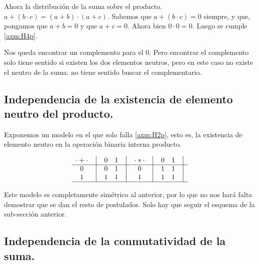 \documentclass[final,12pt,a4paper,twoside,fleqn]{extbook}
\theoremstyle{definition}
\theoremstyle{remark}
\begin{document}
	Ahora la distribución de la suma sobre el producto. \( a + ( b \cdot c )
= (a + b) \cdot (a + c) \). Sabemos que \(a + (b \cdot c) = 0\) siempre, y
que, pongamos que \( a + b = 0 \) y que \(a + c = 0 \). Ahora bien \(0 \cdot
0 = 0\). Luego se cumple \ref{axm:H4p}.


	Nos queda encontrar un complemento para el \(0\). Pero encontrar el
complemento solo tiene sentido si existen los dos elementos neutros, pero en
este caso no existe el neutro de la suma: no tiene sentido buscar el
complementario.



\subsection{Independencia de la existencia de elemento neutro del producto.}



	Exponemos un modelo en el que solo falla \ref{axm:H2p}, esto es, la existencia de elemento neutro en la operación binaria interna producto.



\[
    \begin{matrix}
        {\cdot + \cdot} & \big{\vert} & {0} & {1} & \big{\vert} \\
        \hline
        {0}             & \big{\vert} & {0} & {1} & \big{\vert} \\
        {1}             & \big{\vert} & {1} & {1} & \big{\vert} \\
        \hline
    \end{matrix}
    \quad
    \begin{matrix}
        {\cdot * \cdot} & \big{\vert} & {0} & {1} & \big{\vert} \\
        \hline
        {0}                   & \big{\vert} & {1} & {1} & \big{\vert} \\
        {1}                   & \big{\vert} & {1} & {1} & \big{\vert} \\
        \hline
    \end{matrix}
\]


	Este modelo es completamente simétrico al anterior, por lo que no nos
hará falta demostrar que se dan el resto de postulados. Solo hay que seguir
el esquema de la sub-sección anterior.



\subsection{Independencia de la conmutatividad de la suma.}
\end{document}
